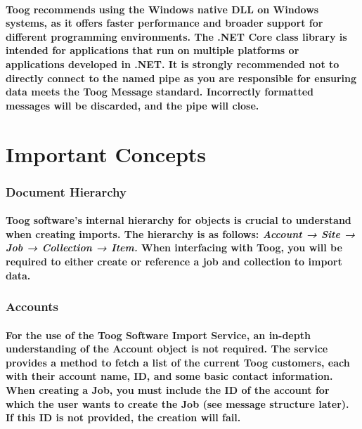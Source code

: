 \documentclass{memoir}
\begin{document}
	\paragraph{
		Toog recommends using the Windows native DLL on Windows systems, as it offers faster performance and broader support for different programming environments. The .NET Core class library is intended for applications that run on multiple platforms or applications developed in .NET. It is strongly recommended not to directly connect to the named pipe as you are responsible for ensuring data meets the Toog Message standard. Incorrectly formatted messages will be discarded, and the pipe will close.
	}
	
	\section{Important Concepts}
	
	\subsubsection{Document Hierarchy}
	
	\paragraph{
		Toog software's internal hierarchy for objects is crucial to understand when creating imports. The hierarchy is as follows: \textit{Account → Site → Job → Collection → Item.} When interfacing with Toog, you will be required to either create or reference a job and collection to import data.
	}
	
	\subsubsection{Accounts}
	
	\paragraph{
		For the use of the Toog Software Import Service, an in-depth understanding of the Account object is not required. The service provides a method to fetch a list of the current Toog customers, each with their account name, ID, and some basic contact information. When creating a Job, you must include the ID of the account for which the user wants to create the Job (see message structure later). If this ID is not provided, the creation \textbf{will} fail.
	}
	
\end{document}
